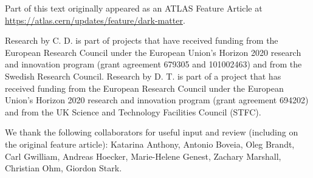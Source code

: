 \documentclass[graybox]{svmult}
\begin{document}
%
\begin{acknowledgement}
Part of this text originally appeared as an ATLAS Feature Article at \url{https://atlas.cern/updates/feature/dark-matter}. 

Research by C. D. is part of projects that have received funding from the European Research Council under the European Union’s Horizon 2020 research and innovation program (grant agreement 679305 and 101002463) and from the Swedish Research Council. Research by D. T. is part of a project that has received funding from the European Research Council under the European Union’s Horizon 2020 research and innovation program (grant agreement 694202) and from the UK Science and Technology Facilities Council (STFC).

We thank the following collaborators for useful input and review (including on the original feature article): Katarina Anthony, Antonio Boveia, Oleg Brandt, Carl Gwilliam, Andreas Hoecker, Marie-Helene Genest, Zachary Marshall, Christian Ohm, Giordon Stark. 
\end{acknowledgement}

\newpage


%
\end{document}
